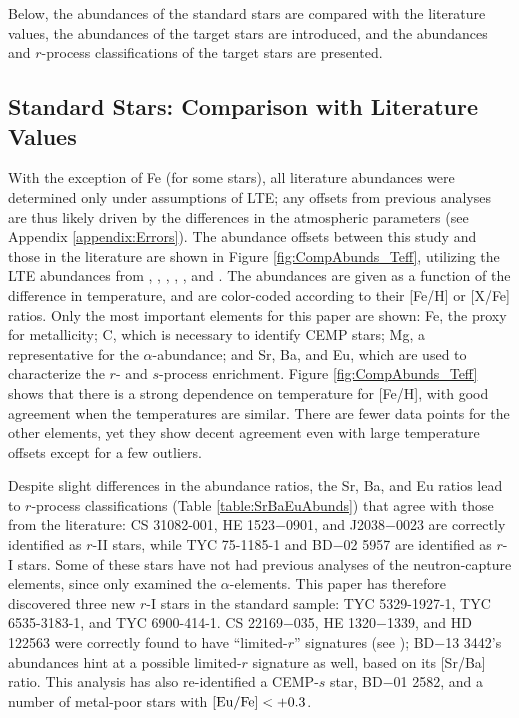 \documentclass[preprint]{aastex61}
\begin{document}
Below, the abundances of the standard stars are compared with the
literature values, the abundances of the target stars are introduced,
and the abundances and $r$-process classifications of the target stars
are presented.

\subsection{Standard Stars: Comparison with Literature Values}\label{subsec:StandardAbunds}
With the exception of Fe (for some stars), all literature abundances
were determined only under assumptions of LTE; any offsets from
previous analyses are thus likely driven by the differences in
the atmospheric parameters (see Appendix \ref{appendix:Errors}).  The
abundance offsets between this study and those in the literature are
shown in Figure \ref{fig:CompAbunds_Teff}, utilizing the LTE
abundances from \citet{Barklem2005}, \citet{Boesgaard2011},
\citet{Hollek2011}, \citet{Ruchti2011}, \citet{Roederer2014}, and
\citet{Thanathibodee2016}.  The abundances are given as a function of
the difference in temperature, and are color-coded according to their
[Fe/H] or [X/Fe] ratios.  Only the most important elements for this
paper are shown: Fe, the proxy for metallicity; C, which is necessary
to identify CEMP stars; Mg, a representative for the
$\alpha$-abundance; and Sr, Ba, and Eu, which are used to characterize
the $r$- and $s$-process enrichment.  Figure \ref{fig:CompAbunds_Teff}
shows that there is a strong dependence on temperature for [Fe/H],
with good agreement when the temperatures are similar.  There are
fewer data points for the other elements, yet they show decent
agreement even with large temperature offsets except for a few
outliers.

Despite slight differences in the abundance ratios, the Sr, Ba, and Eu
ratios lead to $r$-process classifications (Table
\ref{table:SrBaEuAbunds}) that agree with those from the literature:
CS 31082-001, HE 1523$-$0901, and J2038$-$0023 are correctly identified as
$r$-II stars, while TYC 75-1185-1 and BD$-$02 5957 are identified as
$r$-I stars. Some of these stars have not had previous analyses of the
neutron-capture elements, since \citet{Ruchti2011} only examined the
$\alpha$-elements. This paper has therefore discovered three new
$r$-I stars in the standard sample: TYC 5329-1927-1, TYC 6535-3183-1,
and TYC 6900-414-1.  CS 22169$-$035, HE 1320$-$1339, and HD 122563 were
correctly found to have ``limited-$r$'' signatures (see
\citealt{Frebel2018}); BD$-$13 3442's abundances hint at a possible
limited-$r$ signature as well, based on its [Sr/Ba] ratio.  This
analysis has also re-identified a CEMP-$s$ star, BD$-$01 2582, and a
number of metal-poor stars with $[\rm{Eu/Fe}]<+0.3$.
\end{document}
